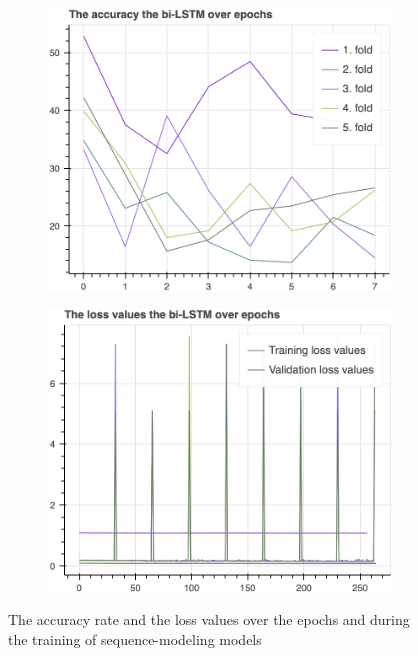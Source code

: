 \begin{figure}[H]
\begin{subfigure}[b]{0.49\textwidth}
				\centering
				\includegraphics[width=\textwidth]{img/bi-LSTM-accuracy.png}
			\end{subfigure}
			\hfill
			\begin{subfigure}[b]{0.49\textwidth}
				\centering
				\includegraphics[width=\textwidth]{img/bi-LSTM-loss_values.png}
			\end{subfigure}
			\caption{The accuracy rate and the loss values over the epochs and during the training of sequence-modeling models}
			\label{fig:accuray_loss_seq_models}
		\end{figure}
